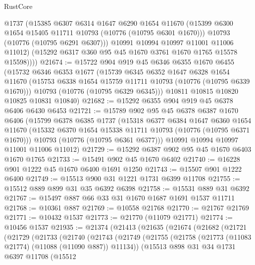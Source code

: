 \begin{lexlean}{RustCore}
\begin{coremodule}
            @1737
            (@15385
              @6307
              @6314
              @1647
              @6290
              @1654
              @11670
              (@15399 @6300 @1654 @15405 @11711 @10793 (@10776 (@10795 @6301 @1670)))
              @10793
              (@10776 (@10795 @6291 @6307)))
            @10991
            @10994
            @10997
            @11001
            @11006
            @11012)
          (@15292 @6317 @360 @95 @45 @1670 @3761 @1670 @1765 @15578 @15598))))
@21674 := @15722
    @904
    @919
    @45
    @6346
    @6355
    @1670
    @6455
    (@15732
      @6346
      @6353
      @1677
      (@15739
        @6345
        @6352
        @1647
        @6328
        @1654
        @11670
        (@15753 @6338 @1654 @15759 @11711 @10793 (@10776 (@10795 @6339 @1670)))
        @10793
        (@10776 (@10795 @6329 @6345)))
      @10811
      @10815
      @10820
      @10825
      @10831
      @10840)
@21682 := @15292 @6355 @904 @919 @45 @6378 @6406 @6430 @6453
@21721 := @15789
    @902
    @95
    @45
    @6378
    @6387
    @1670
    @6406
    (@15799
      @6378
      @6385
      @1737
      (@15318
        @6377
        @6384
        @1647
        @6360
        @1654
        @11670
        (@15332 @6370 @1654 @15338 @11711 @10793 (@10776 (@10795 @6371 @1670)))
        @10793
        (@10776 (@10795 @6361 @6377)))
      @10991
      @10994
      @10997
      @11001
      @11006
      @11012)
@21729 := @15292 @6387 @902 @95 @45 @1670 @6403 @1670 @1765
@21733 := @15491 @902 @45 @1670 @6402
@21740 := @16228 @901 @1222 @45 @1670 @6400 @1691 @1250
@21743 := @15507 @901 @1222 @6400
@21749 := @15513 @900 @31 @1221 @1731 @6399 @11708
@21755 := @15512 @889 @899 @31 @35 @6392 @6398
@21758 := @15531 @889 @31 @6392
@21767 := @15497 @887 @66 @33 @31 @1670 @1687 @1691 @1537 @11711
@21768 := @10361 @887
@21769 := @10558 @21768
@21770 := @21767 @21769
@21771 := @10432 @1537
@21773 := @21770 (@11079 @21771)
@21774 := @10456 @1537
@21935 := @21374
    (@21413
      (@21635
        (@21674
          (@21682
            (@21721
              (@21729
                (@21733
                  (@21740
                    (@21743
                      (@21749
                        (@21755
                          (@21758 (@21773 (@11083 @21774) (@11088 (@11090 @887)) @11134))
                          (@15513
                            @898
                            @31
                            @34
                            @1731
                            @6397
                            @11708
                            (@15512

\end{coremodule}
\end{lexlean}
